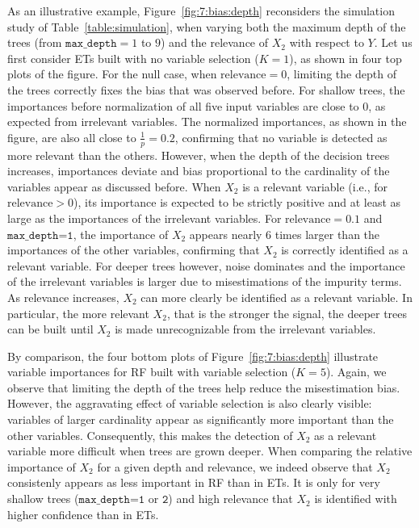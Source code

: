 As an illustrative example, Figure~\ref{fig:7:bias:depth} reconsiders the
simulation study of Table~\ref{table:simulation}, when varying both the maximum
depth of the trees (from $\texttt{max\_depth}=1$ to $9$) and the relevance of
$X_2$ with respect to $Y$.  Let us first consider ETs  built with no variable
selection ($K=1$), as shown in four top plots of the figure. For the null case,
when $\text{relevance}=0$, limiting the depth of the trees correctly fixes the
bias that was observed before. For shallow trees, the importances before
normalization of all five input variables are close to 0, as expected from
irrelevant variables. The normalized importances, as shown in the figure, are
also all close to $\tfrac{1}{p}=0.2$, confirming that no variable is detected
as more relevant than the others. However, when the depth of the decision trees
increases, importances deviate and bias proportional to the cardinality of the
variables appear as discussed before. When $X_2$ is a relevant variable (i.e.,
for $\text{relevance}>0$), its importance is expected to be strictly positive
and at least as large as the importances of the irrelevant variables. For
$\text{relevance}=0.1$ and $\texttt{max\_depth=1}$, the importance of $X_2$
appears nearly $6$ times larger than the importances of the other variables,
confirming that $X_2$ is correctly identified as a relevant variable.  For
deeper trees  however, noise dominates and the importance of the irrelevant
variables is larger due to misestimations of the impurity terms. As  relevance
increases, $X_2$ can more clearly be identified as a relevant variable. In
particular, the more relevant $X_2$, that is the stronger the signal, the
deeper trees can be built until $X_2$ is made unrecognizable from the
irrelevant variables.

By comparison, the four bottom plots of Figure~\ref{fig:7:bias:depth}
illustrate variable importances for RF built with variable selection ($K=5$).
Again, we observe that limiting the depth of the trees help reduce the
misestimation bias. However, the aggravating effect of variable selection is
also clearly visible: variables of larger cardinality appear as significantly
more important than the other variables. Consequently, this makes the
detection of  $X_2$ as a relevant variable more difficult when trees are grown
deeper. When comparing the relative importance of $X_2$ for a given depth and
relevance, we indeed observe that $X_2$ consistenly appears as less important
in RF than in ETs. It is only for very shallow trees ($\texttt{max\_depth=1}$
or $\texttt{2}$) and high relevance that $X_2$ is identified with higher
confidence than in ETs.


